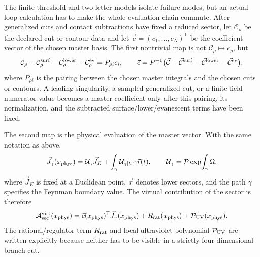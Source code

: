 \begin{controlledapproximation}
\label{ca:production-master-lane-observable-gate}
The finite threshold and two-letter models isolate failure modes, but an
actual loop calculation has to make the whole evaluation chain commute.  After
generalized cuts and contact subtractions have fixed a reduced sector, let
\(\mathcal C_\rho\) be the declared cut or contour data and let
\(\vec c=(c_1,\ldots,c_N)^{\mathsf T}\) be the coefficient vector of the
chosen master basis.  The first nontrivial map is not
\(\mathcal C_\rho\mapsto c_\rho\), but
\begin{equation}
  \mathcal C_\rho-\mathcal C_\rho^{\rm surf}
  -\mathcal C_\rho^{\rm lower}
  -\mathcal C_\rho^{\rm ev}
  =
  P_{\rho i}c_i ,
  \qquad
  \vec c=P^{-1}
  \bigl(\vec{\mathcal C}-\vec{\mathcal C}^{\rm surf}
  -\vec{\mathcal C}^{\rm lower}
  -\vec{\mathcal C}^{\rm ev}\bigr),
  \label{eq:production-master-coefficient-pairing}
\end{equation}
where \(P_{\rho i}\) is the pairing between the chosen master integrals and
the chosen cuts or contours.  A leading singularity, a sampled generalized
cut, or a finite-field numerator value becomes a master coefficient only after
this pairing, its normalization, and the subtracted surface/lower/evanescent
terms have been fixed.

The second map is the physical evaluation of the master vector.  With the
same notation as above,
\begin{equation}
  \vec J_\gamma(x_{\rm phys})
  =
  \mathcal U_\gamma \vec J_E
  +
  \int_\gamma \mathcal U_{\gamma[t,1]}\vec r(t),
  \qquad
  \mathcal U_\gamma=\mathcal P\exp\!\int_\gamma\Omega ,
  \label{eq:production-master-transport}
\end{equation}
where \(\vec J_E\) is fixed at a Euclidean point, \(\vec r\) denotes lower
sectors, and the path \(\gamma\) specifies the Feynman boundary value.  The
virtual contribution of the sector is therefore
\begin{equation}
  \mathcal A_{\rm sec}^{\rm virt}(x_{\rm phys})
  =
  \vec c(x_{\rm phys})^{\mathsf T}\vec J_\gamma(x_{\rm phys})
  +R_{\rm rat}(x_{\rm phys})+\mathcal P_{\rm UV}(x_{\rm phys}) .
  \label{eq:production-master-virtual-sector}
\end{equation}
The rational/regulator term \(R_{\rm rat}\) and local ultraviolet polynomial
\(\mathcal P_{\rm UV}\) are written explicitly because neither has to be
visible in a strictly four-dimensional branch cut.


\end{controlledapproximation}
